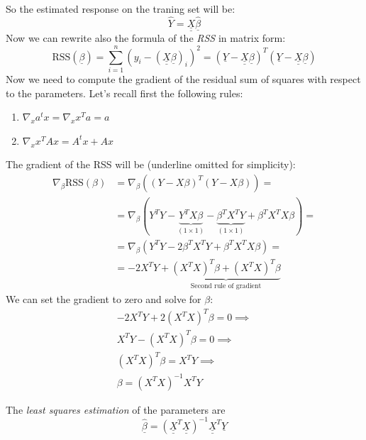 So the estimated response on the traning set will be:
\[
    \hat{Y} = \underline{\underline{X}} \underline{\hat{\beta}}
\]
Now we can rewrite also the formula of the \textit{RSS} in matrix form:
\[
    \text{RSS}(\underline{\beta})  = \sum_{i=1}^{n} \left(y_i - (\underline{\underline{X}} \underline{\beta})_i\right)^2 = (\underline{Y} - \underline{\underline{X}} \underline{\beta})^T(\underline{Y} - \underline{\underline{X}} \underline{\beta})
\]
Now we need to compute the gradient of the residual sum of squares with respect to the parameters. Let's recall first the following rules:
\begin{enumerate}
    \item $\nabla_x a^t x = \nabla_x x^T a =  a$
    \item $\nabla_x x^T A x = A^t x + A x$
\end{enumerate}
The gradient of the RSS will be (underline omitted for simplicity):
\begin{align*}
    \nabla_\beta \text{RSS} (\beta) & = \nabla_\beta \left((Y- X\beta)^T (Y-X\beta) \right) =                                                                                       \\
                                    & = \nabla_\beta \left(Y^T Y - \underbrace{Y^T X\beta}_{(1\times 1)} - \underbrace{\beta^T X^T Y}_{(1\times 1)} + \beta^T X^T X \beta \right) = \\
                                    & = \nabla_\beta\left(Y^T Y - 2 \beta^T X^T Y + \beta^T X^T X \beta\right) =                                                                    \\
                                    & = -2 X^T Y + \underbrace{(X^T X)^T \beta + (X^T X)^T \beta}_{\text{Second rule of gradient}}
\end{align*}
We can set the gradient to zero and solve for $\beta$:
\begin{align*}
    -2 X^T Y + 2(X^T X)^T \beta = 0 \implies \\
    X^T Y - (X^T X)^T \beta = 0 \implies     \\
    (X^T X)^T \beta = X^T Y \implies         \\
    \beta = (X^T X)^{-1} X^T Y
\end{align*}


The \textit{least squares estimation} of the parameters are
\[
    \hat{\underline\beta} = (\underline {\underline X}^T \underline{\underline X} )^{-1} \underline{\underline X}^T \underline Y
\]

